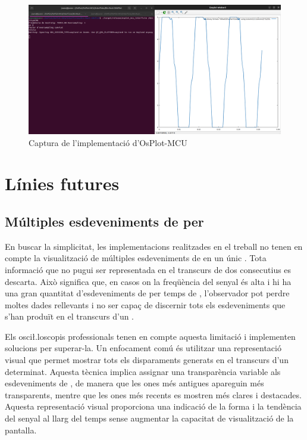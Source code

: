 \documentclass{tfgitic}[2023/06/30]
\begin{document}
\begin{figure}[h]
  \centering \includegraphics[width=\textwidth]{imgs/OsPlot-MCU.png}
  \caption{Captura de l'implementació d'OsPlot-MCU}
\end{figure}

\chapter{Línies futures}

\section{Múltiples esdeveniments de  per }

En buscar la simplicitat, les implementacions realitzades en el
treball no tenen en compte la visualització de múltiples esdeveniments
de  en un únic . Tota informació que no pugui
ser representada en el transcurs de dos  consecutius es
descarta. Això significa que, en casos on la freqüència del senyal és
alta i hi ha una gran quantitat d'esdeveniments de  per
temps de , l'observador pot perdre moltes dades rellevants
i no ser capaç de discernir tots els esdeveniments que s'han produït
en el transcurs d'un .

Els osci\l.loscopis professionals tenen en compte aquesta limitació i
implementen solucions per superar-la. Un enfocament comú és utilitzar
una representació visual que permet mostrar tots els disparaments
generats en el transcurs d'un  determinat. Aquesta tècnica
implica assignar una transparència variable als esdeveniments de
, de manera que les ones més antigues apareguin més
transparents, mentre que les ones més recents es mostren més clares i
destacades. Aquesta representació visual proporciona una indicació de
la forma i la tendència del senyal al llarg del temps sense augmentar
la capacitat de visualització de la pantalla.
\end{document}
